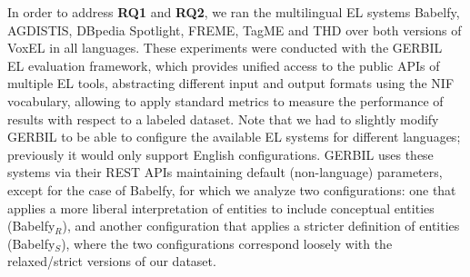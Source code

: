 \documentclass{llncs}
\begin{document}
In order to address \textbf{RQ1} and \textbf{RQ2}, we ran the multilingual EL systems Babelfy, AGDISTIS, DBpedia Spotlight, FREME, TagME and THD over both versions of VoxEL in all languages. These experiments were conducted with the GERBIL~\cite{gerbil-2015} EL evaluation framework, which provides unified access to the public APIs of multiple EL tools, abstracting different input and output formats using the NIF vocabulary, allowing to apply standard metrics to measure the performance of results with respect to a labeled dataset. Note that we had to slightly modify GERBIL to be able to configure the available EL systems for different languages; previously it would only support English configurations. GERBIL uses these systems via their REST APIs maintaining default (non-language) parameters, except for the case of Babelfy, for which we analyze two configurations: one that applies a more liberal interpretation of entities to include conceptual entities (Babelfy$_R$), and another configuration that applies a stricter definition of entities (Babelfy$_S$), where the two configurations correspond loosely with the relaxed/strict versions of our dataset.


\newcommand{\bl}[1]{\textbf{#1}}
\end{document}
